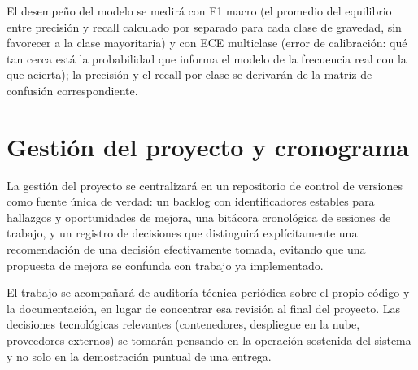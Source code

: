 El desempeño del modelo se medirá con F1 macro (el promedio del
equilibrio entre precisión y recall calculado por separado para cada
clase de gravedad, sin favorecer a la clase mayoritaria) y con ECE
multiclase (error de calibración: qué tan cerca está la probabilidad que
informa el modelo de la frecuencia real con la que acierta); la
precisión y el recall por clase se derivarán de la matriz de confusión
correspondiente.

\section{Gestión del proyecto y cronograma}

La gestión del proyecto se centralizará en un repositorio de control de
versiones como fuente única de verdad: un backlog con identificadores
estables para hallazgos y oportunidades de mejora, una bitácora
cronológica de sesiones de trabajo, y un registro de decisiones que
distinguirá explícitamente una recomendación de una decisión
efectivamente tomada, evitando que una propuesta de mejora se confunda
con trabajo ya implementado.

El trabajo se acompañará de auditoría técnica periódica sobre el propio
código y la documentación, en lugar de concentrar esa revisión al final
del proyecto. Las decisiones tecnológicas relevantes (contenedores,
despliegue en la nube, proveedores externos) se tomarán pensando en la
operación sostenida del sistema y no solo en la demostración puntual de
una entrega.

